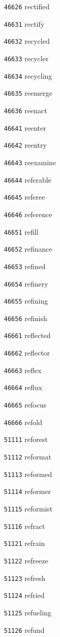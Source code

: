 \documentclass[twoside,11pt]{article}
\begin{document}
\begin{multicols}{5}
\begin{enumerate}
\item[\texttt{46626}] rectified
\item[\texttt{46631}] rectify
\item[\texttt{46632}] recycled
\item[\texttt{46633}] recycler
\item[\texttt{46634}] recycling
\item[\texttt{46635}] reemerge
\item[\texttt{46636}] reenact
\item[\texttt{46641}] reenter
\item[\texttt{46642}] reentry
\item[\texttt{46643}] reexamine
\item[\texttt{46644}] referable
\item[\texttt{46645}] referee
\item[\texttt{46646}] reference
\item[\texttt{46651}] refill
\item[\texttt{46652}] refinance
\item[\texttt{46653}] refined
\item[\texttt{46654}] refinery
\item[\texttt{46655}] refining
\item[\texttt{46656}] refinish
\item[\texttt{46661}] reflected
\item[\texttt{46662}] reflector
\item[\texttt{46663}] reflex
\item[\texttt{46664}] reflux
\item[\texttt{46665}] refocus
\item[\texttt{46666}] refold
\item[\texttt{51111}] reforest
\item[\texttt{51112}] reformat
\item[\texttt{51113}] reformed
\item[\texttt{51114}] reformer
\item[\texttt{51115}] reformist
\item[\texttt{51116}] refract
\item[\texttt{51121}] refrain
\item[\texttt{51122}] refreeze
\item[\texttt{51123}] refresh
\item[\texttt{51124}] refried
\item[\texttt{51125}] refueling
\item[\texttt{51126}] refund

\end{enumerate}
\end{multicols}
\end{document}
